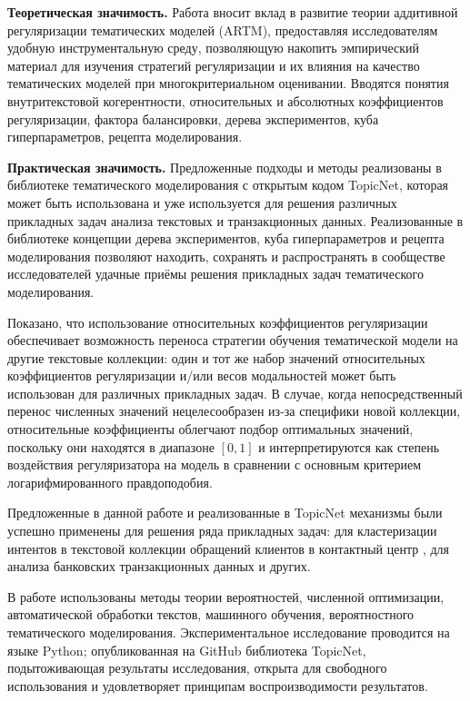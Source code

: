 \textbf{Теоретическая значимость.}
Работа вносит вклад в развитие теории аддитивной регуляризации тематических моделей (ARTM), предоставляя исследователям удобную инструментальную среду, позволяющую накопить эмпирический материал для изучения стратегий регуляризации и их влияния на качество тематических моделей при многокритериальном оценивании. Вводятся понятия внутритекстовой когерентности, относительных и абсолютных коэффициентов регуляризации, фактора балансировки, дерева экспериментов, куба гиперпараметров, рецепта моделирования.

\textbf{Практическая значимость.}
Предложенные подходы и методы реализованы в библиотеке тематического моделирования с открытым кодом TopicNet, которая может быть использована и уже используется для решения различных прикладных задач анализа текстовых и транзакционных данных. Реализованные в библиотеке концепции дерева экспериментов, куба гиперпараметров и рецепта моделирования позволяют находить, сохранять и распространять в сообществе исследователей удачные приёмы решения прикладных задач тематического моделирования.

Показано, что использование относительных коэффициентов регуляризации обеспечивает возможность переноса стратегии обучения тематической модели на другие текстовые коллекции: один и тот же набор значений относительных коэффициентов регуляризации и/или весов модальностей может быть использован для различных прикладных задач. В случае, когда непосредственный перенос численных значений нецелесообразен из-за специфики новой коллекции, относительные коэффициенты облегчают подбор оптимальных значений, поскольку они находятся в диапазоне $[0, 1]$ и интерпретируются как степень воздействия регуляризатора на модель в сравнении с основным критерием логарифмированного правдоподобия.

Предложенные в данной работе и реализованные в TopicNet механизмы были успешно применены для решения ряда прикладных задач:
для кластеризации интентов в текстовой коллекции обращений клиентов в контактный центр \cite{popov_hier},
для анализа банковских транзакционных данных \cite{egorov2019topic} и других.

{\methods} В работе использованы методы теории вероятностей, численной оптимизации, автоматической обработки текстов, машинного обучения, вероятностного тематического моделирования. Экспериментальное исследование проводится на языке Python; опубликованная на GitHub библиотека TopicNet, подытоживающая результаты исследования, открыта для свободного использования и удовлетворяет принципам воспроизводимости результатов.

